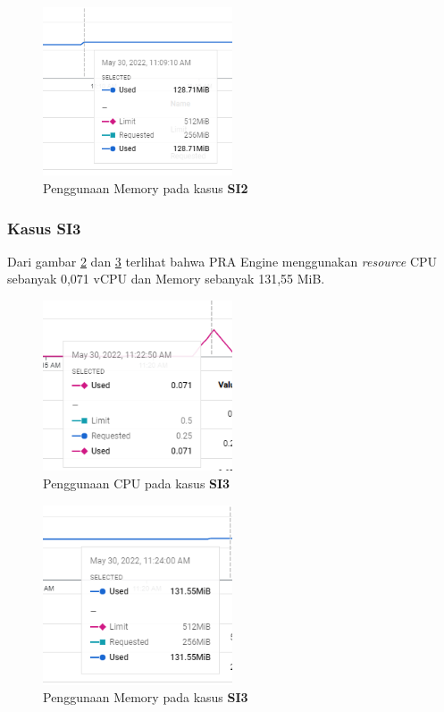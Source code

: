 \begin{figure}[!htb]
	\centering
	\includegraphics[width=0.5\textwidth]{resources/ch4/resource/2-mem.png}
	\caption{Penggunaan Memory pada kasus \textbf{SI2}}
	\label{result_mem_2}
\end{figure}

\pagebreak

\subsubsection{Kasus SI3}
Dari gambar \ref{result_cpu_3} dan \ref{result_mem_3} terlihat bahwa PRA Engine menggunakan \textit{resource} CPU sebanyak 0,071 vCPU dan Memory sebanyak 131,55 MiB. 

\begin{figure}[!htb]
	\centering
	\includegraphics[width=0.5\textwidth]{resources/ch4/resource/3-cpu.png}
	\caption{Penggunaan CPU pada kasus \textbf{SI3}}
	\label{result_cpu_3}
\end{figure}

\begin{figure}[!htb]
	\centering
	\includegraphics[width=0.5\textwidth]{resources/ch4/resource/3-mem.png}
	\caption{Penggunaan Memory pada kasus \textbf{SI3}}
	\label{result_mem_3}
\end{figure}


